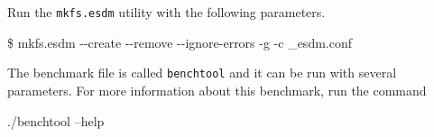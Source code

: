 Run the \texttt{mkfs.esdm} utility with the following parameters.

\begin{framed}
\$ mkfs.esdm {-}{-}create {-}{-}remove {-}{-}ignore-errors -g -c \_esdm.conf
\end{framed}

The benchmark file is called \texttt{benchtool} and it can be run with several parameters. For more information about this benchmark, run the command

\begin{framed}
./benchtool --help
\end{framed}

\begin{comment}

From here, nothing else works anymore. All the benchmarks receive:

[lucy-GS70-2PC-Stealth:04433] *** Process received signal ***
[lucy-GS70-2PC-Stealth:04433] Signal: Segmentation fault (11)

and the parallel process have the error:

mpiexec was unable to launch the specified application as it could not access
or execute an executable:

- - -

Executable: ./src/benchtool
Node: lucy-GS70-2PC-Stealth

while attempting to start process rank 0.

\section{Tests}

The benchmark can run with various levels of parallelism, domain decomposition and access patterns.

\subsection{Test 1}

./benchtool -f=esdm://longtest -w

\subsection{Test 2}

./benchtool -f=esdm://longtest -r

\subsection{Test 3}


\end{comment}
